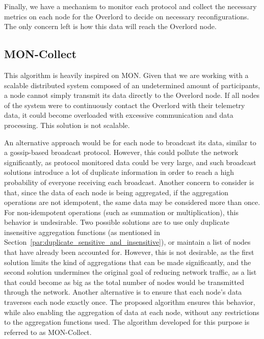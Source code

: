 Finally, we have a mechanism to monitor each protocol and collect the necessary metrics on each node for the Overlord to decide on necessary reconfigurations. The only concern left is how this data will reach the Overlord node.

\subsection{MON-Collect}
\label{ssec:moncollect}
This algorithm is heavily inspired on MON\cite{Liang2005}. Given that we are working with a scalable distributed system composed of an undetermined amount of participants, a node cannot simply transmit its data directly to the Overlord node. If all nodes of the system were to continuously contact the Overlord with their telemetry data, it could become overloaded with excessive communication and data processing. This solution is not scalable.

An alternative approach would be for each node to broadcast its data, similar to a gossip-based broadcast protocol. However, this could pollute the network significantly, as protocol monitored data could be very large, and such broadcast solutions introduce a lot of duplicate information in order to reach a high probability of everyone receiving each broadcast\cite{Leitao2007a}. Another concern to consider is that, since the data of each node is being aggregated, if the aggregation operations are not idempotent, the same data may be considered more than once. For non-idempotent operations (such as summation or multiplication), this behavior is undesirable. Two possible solutions are to use only duplicate insensitive aggregation functions (as mentioned in Section~\ref{par:duplicate_sensitive_and_insensitive}), or maintain a list of nodes that have already been accounted for. However, this is not desirable, as the first solution limits the kind of aggregations that can be made significantly, and the second solution undermines the original goal of reducing network traffic, as a list that could become as big as the total number of nodes would be transmitted through the network. Another alternative is to ensure that each node's data traverses each node exactly once. The proposed algorithm ensures this behavior, while also enabling the aggregation of data at each node, without any restrictions to the aggregation functions used. The algorithm developed for this purpose is referred to as MON-Collect.

